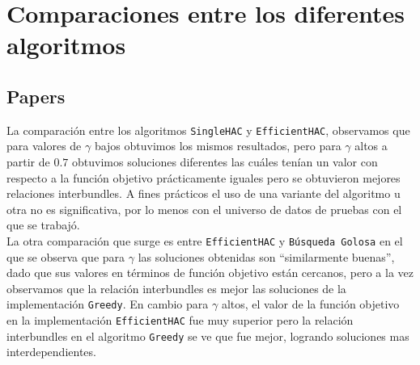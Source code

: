 \section{Comparaciones entre los diferentes algoritmos}\label{conc:compDifAlgo}
\subsection{Papers}
La comparación entre los algoritmos \texttt{SingleHAC} y \texttt{EfficientHAC}, 
observamos que para valores de $\gamma$ bajos obtuvimos los mismos resultados, pero para $\gamma$ altos a 
partir de $0.7$ obtuvimos soluciones diferentes las cuáles tenían un valor con respecto a la 
función objetivo prácticamente iguales pero se obtuvieron mejores relaciones interbundles. A fines prácticos el uso de una variante del algoritmo u otra no es significativa, por lo menos con el universo de datos de pruebas con el que se trabajó.\\
La otra comparación que surge es entre \texttt{EfficientHAC} y \texttt{Búsqueda Golosa} en el que se observa 
que para $\gamma$ las soluciones obtenidas son \textquotedblleft similarmente 
buenas\textquotedblright , dado que sus valores en términos de función objetivo están cercanos, 
pero a la vez observamos que la relación interbundles es mejor las soluciones de la implementación 
\texttt{Greedy}. En cambio para $\gamma$ altos, el valor de la función objetivo en la 
implementación \texttt{EfficientHAC} fue muy superior pero la relación interbundles en el algoritmo 
\texttt{Greedy} se ve que fue mejor, logrando soluciones mas interdependientes.

